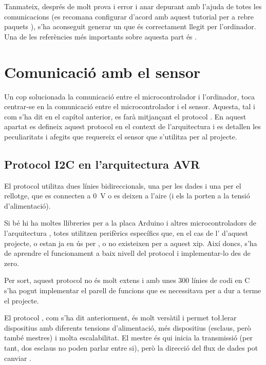 Tanmateix, després de molt prova i error i anar depurant amb l'ajuda de
 totes les comunicacions (es recomana configurar 
d'acord amb aquest tutorial per a rebre paquets 
\cite{InstallWireshark}), s'ha aconseguit
generar un  que és correctament llegit per l'ordinador.
Una de les referències més importants sobre aquesta part és \cite{VusbProjects}.

\section{Comunicació amb el sensor}

Un cop solucionada la comunicació entre el microcontrolador i l'ordinador, toca
centrar-se en la comunicació entre el microcontrolador i el sensor. Aquesta, tal
i com s'ha dit en el capítol anterior, es farà mitjançant el protocol .
En aquest apartat es defineix aquest protocol en el context de l'arquitectura
 i es detallen les peculiaritats i afegits que requereix el sensor que
s'utilitza per al projecte.

\subsection{Protocol I2C en l'arquitectura AVR}

El protocol  utilitza dues línies bidireccionals, una per les dades i una per
el rellotge, que es connecten a \SI[round-mode=places,round-precision=0]{0}{\volt}
o es deixen a l'aire (i els  la porten a la tensió d'alimentació).

Si bé hi ha moltes llibreries per a la placa Arduino i altres microcontroladors
de l'arquitectura , totes utilitzen perifèrics específics que, en el
cas de l' d'aquest projecte, o estan ja en ús per , o
no existeixen per a aquest xip. Així doncs, s'ha de aprendre el funcionament a
baix nivell del protocol i implementar-lo des de zero.

Per sort, aquest protocol no és molt extens i amb unes 300 línies de codi en C
s'ha pogut implementar el parell de funcions que es necessitava per a dur a
terme el projecte.

El protocol , com s'ha dit anteriorment, és molt versàtil i permet 
to\l.lerar dispositius amb diferents tensions d'alimentació, més dispositius
(esclaus, però també mestres) i molta escalabilitat. El mestre és qui inicia
la transmissió (per tant, dos esclaus no poden parlar entre si), però la
direcció del flux de dades pot canviar \cite{I2c}.

